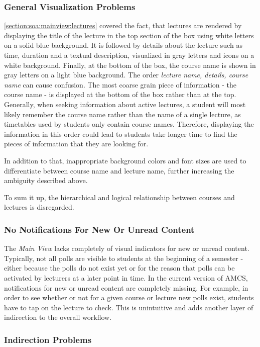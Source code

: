 \subsubsection{General Visualization Problems}
\label{section:con:problems:mainview:generalvis} \autoref{section:soa:mainview:lectures} covered the fact, that lectures are rendered by displaying the title of the lecture in the top section of the box using white letters on a solid blue background. It is followed by details about the lecture such as time, duration and a textual description, visualized in gray letters and icons on a white background. Finally, at the bottom of the box, the course name is shown in gray letters on a light blue background. The order \emph{lecture name, details, course name} can cause confusion.
The most coarse grain piece of information - the course name - is displayed at the bottom of the box rather than at the top. Generally, when seeking information about active lectures, a student will most likely remember the course name rather than the name of a single lecture, as timetables used by students only contain course names. Therefore, displaying the information in this order could lead to students take longer time to find the pieces of information that they are looking for.

In addition to that, inappropriate background colors and font sizes are used to differentiate between course name and lecture name, further increasing the ambiguity described above.


To sum it up, the hierarchical and logical relationship between courses and lectures is disregarded. 

\subsubsection{No Notifications For New Or Unread Content}
\label{section:con:problems:noindicators}
The \emph{Main View} lacks completely of visual indicators for new or unread content. Typically, not all polls are visible to students at the beginning of a semester - either because the polls do not exist yet or for the reason that polls can be activated by lecturers at a later point in time. In the current version of AMCS, notifications for new or unread content are completely missing. For example, in order to see whether or not for a given course or lecture new polls exist, students have to tap on the lecture to check. This is unintuitive and adds another layer of indirection to the overall workflow.

\subsubsection{Indirection Problems}


